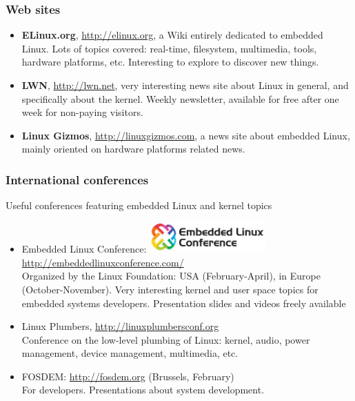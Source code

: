 \begin{frame}
  \frametitle{Web sites}
  \begin{itemize}
  \item {\bf ELinux.org}, \url{http://elinux.org}, a Wiki entirely
    dedicated to embedded Linux. Lots of topics covered: real-time,
    filesystem, multimedia, tools, hardware platforms,
    etc. Interesting to explore to discover new things.
  \item {\bf LWN}, \url{http://lwn.net}, very interesting news site
    about Linux in general, and specifically about the kernel. Weekly
    newsletter, available for free after one week for non-paying
    visitors.
  \item {\bf Linux Gizmos}, \url{http://linuxgizmos.com}, a news site
    about embedded Linux, mainly oriented on hardware platforms
    related news.
  \end{itemize}
\end{frame}

\begin{frame}
  \frametitle{International conferences}
  Useful conferences featuring embedded Linux and kernel topics
  \begin{itemize}
  \item
    Embedded Linux Conference:
    \includegraphics[width=0.35\textwidth]{slides/sysdev-references/elc-logo.png}\\
    \url{http://embeddedlinuxconference.com/}\\
    Organized by the Linux Foundation: USA (February-April), in Europe
    (October-November). Very interesting kernel and user space topics for embedded
    systems developers. Presentation slides and videos freely available
  \item Linux Plumbers, \url{http://linuxplumbersconf.org}\\
    Conference on the low-level plumbing of Linux: kernel, audio,
    power management, device management, multimedia, etc.
  \item FOSDEM: \url{http://fosdem.org} (Brussels, February)\\
    For developers. Presentations about system development.
  \end{itemize}
\end{frame}
